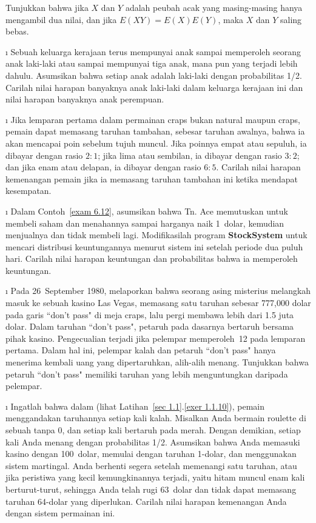 \begin{LJSItem}
\istar\label{exer 6.1.7} Tunjukkan bahwa jika $X$ dan $Y$ adalah peubah acak yang masing-masing hanya
mengambil dua nilai, dan jika $E(XY) = E(X)E(Y)$, maka $X$ dan $Y$ saling bebas.

\i\label{exer 6.1.8} Sebuah keluarga kerajaan terus mempunyai anak sampai memperoleh seorang anak laki-laki atau sampai
mempunyai tiga anak, mana pun yang terjadi lebih dahulu. Asumsikan bahwa setiap anak adalah laki-laki dengan
probabilitas 1/2. Carilah nilai harapan banyaknya anak laki-laki dalam keluarga kerajaan ini dan
nilai harapan banyaknya anak perempuan.

\i\label{exer 6.1.9} Jika lemparan pertama dalam permainan craps bukan natural maupun
craps, pemain dapat memasang taruhan tambahan, sebesar taruhan awalnya, bahwa ia akan
mencapai poin sebelum tujuh muncul. Jika poinnya empat atau sepuluh, ia dibayar
dengan rasio $2 : 1$; jika lima atau sembilan, ia dibayar dengan rasio $3 : 2$; dan jika
enam atau delapan, ia dibayar dengan rasio $6 : 5$. Carilah nilai harapan kemenangan pemain
jika ia memasang taruhan tambahan ini ketika mendapat kesempatan.

\i\label{exer 6.1.10} Dalam Contoh~\ref{exam 6.12}, asumsikan bahwa Tn. Ace memutuskan untuk membeli saham
dan menahannya sampai harganya naik 1~dolar, kemudian menjualnya dan tidak membeli lagi. Modifikasilah
program {\bf StockSystem} untuk mencari distribusi keuntungannya menurut sistem ini
setelah periode dua puluh hari. Carilah nilai harapan keuntungan dan probabilitas bahwa ia memperoleh
keuntungan.

\i\label{exer 6.1.11} Pada 26~September 1980,  melaporkan
bahwa seorang asing misterius melangkah masuk ke sebuah kasino Las Vegas, memasang satu taruhan sebesar
777{,}000 dolar pada garis ``don't pass" di meja craps, lalu pergi membawa
lebih dari 1.5 juta dolar. Dalam taruhan ``don't pass", petaruh pada dasarnya
bertaruh bersama pihak kasino. Pengecualian terjadi jika pelempar memperoleh~12 pada lemparan
pertama. Dalam hal ini, pelempar kalah dan petaruh ``don't pass" hanya menerima kembali
uang yang dipertaruhkan, alih-alih menang. Tunjukkan bahwa petaruh ``don't pass" memiliki taruhan yang lebih
menguntungkan daripada pelempar.

\i\label{exer 6.1.12} Ingatlah bahwa dalam  (lihat Latihan~\ref{sec 1.1}.\ref{exer 1.1.10}), pemain menggandakan
taruhannya setiap kali kalah. Misalkan Anda
bermain roulette di sebuah  tanpa 0, dan setiap kali bertaruh pada merah.
Dengan demikian, setiap kali Anda menang dengan probabilitas 1/2. Asumsikan bahwa Anda memasuki kasino dengan
100~dolar, memulai dengan
taruhan 1-dolar, dan menggunakan sistem martingal. Anda berhenti segera setelah memenangi satu taruhan, atau jika peristiwa yang kecil kemungkinannya terjadi, yaitu hitam muncul enam kali berturut-turut,
sehingga Anda telah rugi 63~dolar dan tidak dapat memasang taruhan 64-dolar yang diperlukan. Carilah
nilai harapan kemenangan Anda dengan sistem permainan ini.


\end{LJSItem}
